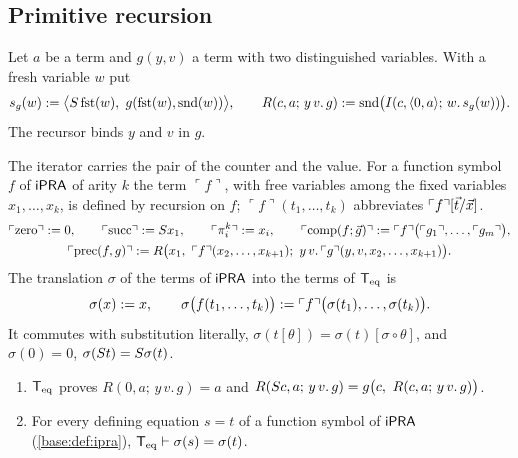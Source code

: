 \subsection{Primitive recursion}

\begin{definition}
\label{base:def:rec}
Let $a$ be a term and $g(y,v)$ a term with two distinguished variables.
With a fresh variable $w$ put
\[
 s_g(w)\mathrel{:=}\bigl\langle S\operatorname{fst}(w),\
   g(\operatorname{fst}(w),\operatorname{snd}(w))\bigr\rangle,\qquad
 R(c,a;\,y\,v.\,g)\mathrel{:=}
   \operatorname{snd}\bigl(I(c,\langle 0,a\rangle;\,w.\,s_g(w))\bigr).
\]
The recursor binds $y$ and $v$ in $g$.
\end{definition}

The iterator carries the pair of the counter and the value.  For a function
symbol $f$ of $\mathsf{iPRA}$ of arity $k$ the term $\ulcorner f\urcorner$, with free
variables among the fixed variables $x_1,\dots,x_k$, is defined by recursion
on $f$; $\ulcorner f\urcorner(t_1,\dots,t_k)$ abbreviates
$\ulcorner f\urcorner[\vec t/\vec x]$.
\begin{gather*}
 \ulcorner\mathrm{zero}\urcorner\mathrel{:=} 0,\qquad
 \ulcorner\mathrm{succ}\urcorner\mathrel{:=}S x_1,\qquad
 \ulcorner\pi^k_i\urcorner\mathrel{:=} x_i,\qquad
 \ulcorner\mathrm{comp}(f;\vec g)\urcorner\mathrel{:=}
   \ulcorner f\urcorner\bigl(\ulcorner g_1\urcorner,\dots,
   \ulcorner g_m\urcorner\bigr),\\
 \ulcorner\mathrm{prec}(f,g)\urcorner\mathrel{:=}
   R\bigl(x_1,\ \ulcorner f\urcorner(x_2,\dots,x_{k+1});\
     y\,v.\,\ulcorner g\urcorner(y,v,x_2,\dots,x_{k+1})\bigr).
\end{gather*}
The translation $\sigma$ of the terms of $\mathsf{iPRA}$ into the terms of $\mathsf{T}_{\mathrm{eq}}$ is
\[
 \sigma(x)\mathrel{:=} x,\qquad
 \sigma\bigl(f(t_1,\dots,t_k)\bigr)\mathrel{:=}
   \ulcorner f\urcorner\bigl(\sigma(t_1),\dots,\sigma(t_k)\bigr).
\]
It commutes with substitution literally,
$\sigma(t[\theta])=\sigma(t)[\sigma\circ\theta]$, and
$\sigma(0)=0$, $\sigma(S t)=S\sigma(t)$.

\begin{theorem}
\label{base:thm:primrec}
\begin{enumerate}[label=\textup{(\roman*)}]
\item $\mathsf{T}_{\mathrm{eq}}$ proves $R(0,a;\,y\,v.\,g)=a$ and
 $R(\Suc c,a;\,y\,v.\,g)=g\bigl(c,\ R(c,a;\,y\,v.\,g)\bigr)$.
\item For every defining equation $s=t$ of a function symbol of $\mathsf{iPRA}$
 (\cref{base:def:ipra}), $\mathsf{T}_{\mathrm{eq}}\vdash\sigma(s)=\sigma(t)$.
\end{enumerate}
\end{theorem}

